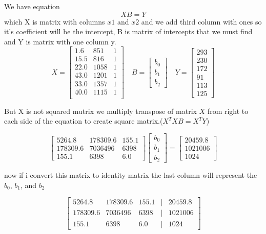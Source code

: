 \documentclass{article}
\begin{document}
	We have equation \[XB=Y\] which X is matrix with columns \(x1\) and \(x2\) and we add third column with ones so it's coefficient will be the intercept, B is matrix of intercepts that we must find and Y is matrix with one column y.
	\[
	X=
	\begin{bmatrix}
		1.6 & 851 & 1 \\
		15.5 & 816 & 1 \\
		22.0 & 1058 & 1 \\
		43.0 & 1201 & 1 \\
		33.0 & 1357 & 1 \\
		40.0 & 1115 & 1 \\
	\end{bmatrix}
	\quad B=
	\begin{bmatrix}
		b_0 \\
		b_1 \\
		b_2
	\end{bmatrix} \quad Y=
	\begin{bmatrix}
		293 \\
		230 \\
		172 \\
		91 \\
		113 \\
		125 
	\end{bmatrix}
	\]
	
	But X is not squared mutrix we multiply transpose of matrix \(X\) from right to each side of the equation to create square matrix.(\(X^T X B = X^T Y\))
	
	\[
	\begin{bmatrix}
		5264.8 & 178309.6 & 155.1 \\
		178309.6 & 7036496 & 6398 \\
		155.1 & 6398 & 6.0
	\end{bmatrix}
	\begin{bmatrix}
		b_0 \\
		b_1 \\
		b_2
	\end{bmatrix} =
	\begin{bmatrix}
		20459.8 \\
		1021006 \\
		1024 
	\end{bmatrix}
	\]
	
	now if i convert this matrix to identity matrix the last column will represent the \( b_0 \), \( b_1 \), and \( b_2 \)
	
	
	\[
	\begin{bmatrix}
		5264.8 & 178309.6 & 155.1 & \vert & 20459.8 \\
		178309.6 & 7036496 & 6398 & \vert & 1021006 \\
		155.1 & 6398 & 6.0 & \vert & 1024
	\end{bmatrix}
	\]
	
\end{document}
